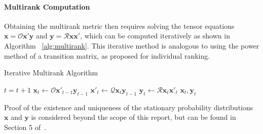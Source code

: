 \paragraph{Multirank Computation}
Obtaining the multirank metric then requires solving the tensor equations $\mathbf{x} = \mathcal{O}\mathbf{x'y}$ and $\mathbf{y} = \mathcal{R}\mathbf{x}\mathbf{x'}$, which can be computed iteratively as shown in Algorithm ~\ref{alg:multirank}. This iterative method is analogous to using the power method of a transition matrix, as proposed for individual ranking. 

    \begin{algorithm}
        \caption{Iterative Multirank Algorithm}
        \begin{algorithmic}[1]
                \State $t = t+1$
                \State $\mathbf{x}_t \leftarrow \mathcal{O} \mathbf{x'}_{t-1} \mathbf{y}_{t-1}$
                \State $\mathbf{x'}_t \leftarrow \mathcal{Q} \mathbf{x}_{t} \mathbf{y}_{t-1}$
                \State $\mathbf{y}_t \leftarrow \mathcal{R} \mathbf{x}_t \mathbf{x'}_t$
            \EndWhile
            \State \Return $\mathbf{x}_t, \mathbf{y}_t$
        \EndFunction
        \end{algorithmic}
        \label{alg:multirank}
    \end{algorithm}

Proof of the existence and uniqueness of the stationary probability distributions $\mathbf{x}$ and $\mathbf{y}$ is considered beyond the scope of this report, but can be found in Section 5 of~\cite{ng2011multirank}.